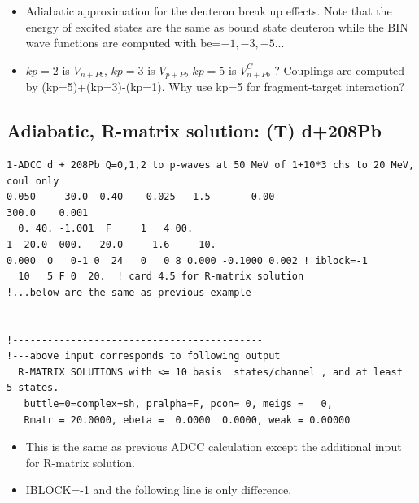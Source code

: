\documentclass[11pt]{book}
\begin{document}
\begin{itemize}
\item Adiabatic approximation for the deuteron break up effects.
      Note that the energy of excited states are the same as
      bound state deuteron while the BIN wave functions are computed
      with be=$-1,-3,-5..$.  
\item $kp=2$ is $V_{n+Pb}$, $kp=3$ is $V_{p+Pb}$
      $kp=5$ is $V^C_{n+Pb}$ ?      
      Couplings are computed by (kp=5)+(kp=3)-(kp=1).
      {\color{blue} Why use kp=5 for fragment-target interaction? } 
\end{itemize}

\subsection{Adiabatic, R-matrix solution: (T) d+208Pb}
\begin{small} 
\begin{lstlisting}[frame=single]
1-ADCC d + 208Pb Q=0,1,2 to p-waves at 50 MeV of 1+10*3 chs to 20 MeV, coul only
0.050    -30.0  0.40    0.025   1.5      -0.00
300.0    0.001
  0. 40. -1.001  F     1   4 00. 
1  20.0  000.   20.0    -1.6    -10.
0.000  0   0-1 0  24   0   0 8 0.000 -0.1000 0.002 ! iblock=-1
  10   5 F 0  20.  ! card 4.5 for R-matrix solution
!...below are the same as previous example  


!-------------------------------------------
!---above input corresponds to following output
  R-MATRIX SOLUTIONS with <= 10 basis  states/channel , and at least  5 states.
   buttle=0=complex+sh, pralpha=F, pcon= 0, meigs =   0, 
   Rmatr = 20.0000, ebeta =  0.0000  0.0000, weak = 0.00000       
\end{lstlisting}
\end{small} 
\begin{itemize}
\item This is the same as previous ADCC calculation except the
      additional input for R-matrix solution. 
\item IBLOCK=-1 and the following line is only difference. 

   
\end{itemize}
\end{document}
